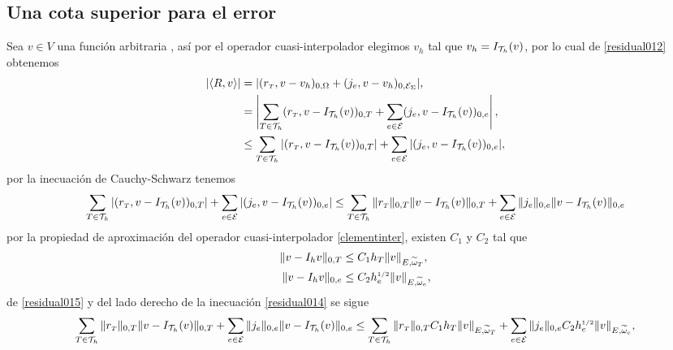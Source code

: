 \subsection{Una cota superior para el error}
Sea $v\in V$ una funci\'on arbitraria , as\'i por el operador cuasi-interpolador elegimos $v_{h}$ tal que $v_{h}=I_{{\mathcal{T}}_{h}}(v)$, por lo cual de \eqref{residual012} obtenemos
\begin{equation}\label{residual013}
\begin{split}
|\langle R,v \rangle| &= | (r_{\text{\tiny $T$}},v-v_{h})_{0,\Omega} + (j_{e},v-v_{h})_{0,{\mathcal{E}}_{\Sigma}} |,\\
&= \left| \sum_{T\in{\ensuremath{\mathcal{T}}}_{h}}(r_{\text{\tiny $T$}},v-I_{{\mathcal{T}}_{h}}(v))_{0,T} + \sum_{e\in {\ensuremath{\mathcal{E}}}}(j_{e},v-I_{{\mathcal{T}}_{h}}(v))_{0,e} \right|,\\
&\leq \sum_{T\in{\ensuremath{\mathcal{T}}}_{h}}|(r_{\text{\tiny $T$}},v-I_{{\mathcal{T}}_{h}}(v))_{0,T}| + \sum_{e\in {\ensuremath{\mathcal{E}}}}|(j_{e},v-I_{{\mathcal{T}}_{h}}(v))_{0,e}|,
\end{split}
\end{equation}
por la inecuaci\'on de Cauchy-Schwarz tenemos 
\begin{equation}\label{residual014}
\sum_{T\in{\ensuremath{\mathcal{T}}}_{h}}|(r_{\text{\tiny $T$}},v-I_{{\mathcal{T}}_{h}}(v))_{0,T}| + \sum_{e\in {\ensuremath{\mathcal{E}}}}|(j_{e},v-I_{{\mathcal{T}}_{h}}(v))_{0,e}|\leq\sum_{T\in{\ensuremath{\mathcal{T}}}_{h}}\|r_{\text{\tiny $T$}}\|_{0,T} \|v-I_{{\mathcal{T}}_{h}}(v)\|_{0,T} + \sum_{e\in {\ensuremath{\mathcal{E}}}}\|j_{e}\|_{0,e} \|v-I_{{\mathcal{T}}_{h}}(v)\|_{0,e}
\end{equation}
por la propiedad de aproximaci\'on del operador cuasi-interpolador  \eqref{clementinter}, existen $C_{1}$ y $C_{2}$ tal que 
\begin{equation}\label{residual015}
\begin{split}
\| v -I_{h}v \|_{0,T}&\leq C_{1}h_{T}\| v\|_{E,\widetilde{\omega}_{T}},\\
\| v -I_{h}v \|_{0,e}&\leq C_{2}h^{\text{\tiny $1/2$}}_{e}\| v\|_{E,\widetilde{\omega}_{e}},
\end{split}
\end{equation}
de \eqref{residual015} y del lado derecho de la inecuaci\'on \eqref{residual014} se sigue
\begin{equation}\label{residual016}
\sum_{T\in{\ensuremath{\mathcal{T}}}_{h}}\|r_{\text{\tiny $T$}}\|_{0,T} \|v-I_{{\mathcal{T}}_{h}}(v)\|_{0,T} + \sum_{e\in {\ensuremath{\mathcal{E}}}}\|j_{e}\|_{0,e} \|v-I_{{\mathcal{T}}_{h}}(v)\|_{0,e}\leq \sum_{T\in{\ensuremath{\mathcal{T}}}_{h}}\|r_{\text{\tiny $T$}}\|_{0,T}C_{1}h_{T}\| v\|_{E,\widetilde{\omega}_{T}} + \sum_{e\in {\ensuremath{\mathcal{E}}}}\|j_{e}\|_{0,e} C_{2}h^{\text{\tiny $1/2$}}_{e}\| v\|_{E,\widetilde{\omega}_{e}},
\end{equation}
